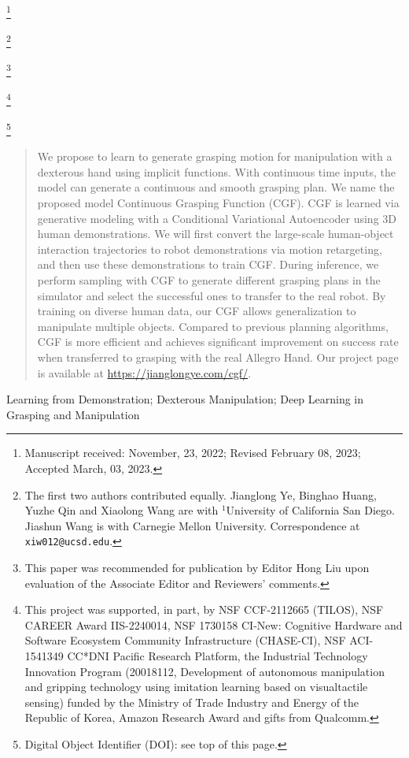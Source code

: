 \documentclass[letterpaper, 10 pt, journal, twoside]{IEEEtran}
\newcommand\blfootnote[1]{%
  \begingroup
  \renewcommand\thefootnote{}\footnote{#1}%
  \addtocounter{footnote}{-1}%
  \endgroup
}
\begin{document}
\blfootnote{Manuscript received: November, 23, 2022; Revised February 08, 2023; Accepted March, 03, 2023.}
\blfootnote{The first two authors contributed equally. Jianglong Ye, Binghao Huang, Yuzhe Qin and Xiaolong Wang are with $^1$University of California San Diego. Jiashun Wang is with Carnegie Mellon University. Correspondence at {\tt\footnotesize xiw012@ucsd.edu}.}
\blfootnote{This paper was recommended for publication by Editor Hong Liu upon evaluation of the Associate Editor and Reviewers' comments.}
\blfootnote{This project was supported, in part, by NSF CCF-2112665 (TILOS), NSF CAREER Award IIS-2240014, NSF 1730158 CI-New: Cognitive Hardware and Software Ecosystem Community Infrastructure (CHASE-CI), NSF ACI-1541349 CC*DNI Pacific Research Platform, the Industrial Technology Innovation Program (20018112, Development of autonomous manipulation and gripping technology using imitation learning based on visualtactile sensing) funded by the Ministry of Trade Industry and Energy of the Republic of Korea, Amazon Research Award and gifts from Qualcomm.}
\blfootnote{Digital Object Identifier (DOI): see top of this page.}

\vspace{-0.14in}
\begin{abstract}
We propose to learn to generate grasping motion for manipulation with a dexterous hand using implicit functions. With continuous time inputs, the model can generate a continuous and smooth grasping plan. We name the proposed model Continuous Grasping Function (CGF). CGF is learned via generative modeling with a Conditional Variational Autoencoder using 3D human demonstrations. We will first convert the large-scale human-object interaction trajectories to robot demonstrations via motion retargeting, and then use these demonstrations to train CGF. During inference, we perform sampling with CGF to generate different grasping plans in the simulator and select the successful ones to transfer to the real robot. By training on diverse human data, our CGF allows generalization to manipulate multiple objects. Compared to previous planning algorithms, CGF is more efficient and achieves significant improvement on success rate when transferred to grasping with the real Allegro Hand. Our project page is available at \url{https://jianglongye.com/cgf/}.
\end{abstract}

\begin{IEEEkeywords}
Learning from Demonstration; Dexterous Manipulation; Deep Learning in Grasping and Manipulation
\end{IEEEkeywords}
\end{document}
